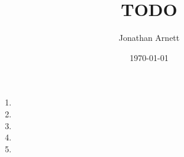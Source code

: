 \documentclass[]{article}
\begin{document}
\title{TODO}
\author{Jonathan Arnett}
\date{\today}
\maketitle

\begin{enumerate}
\item
\item
\item
\item
\item
\end{enumerate}
\end{document}

